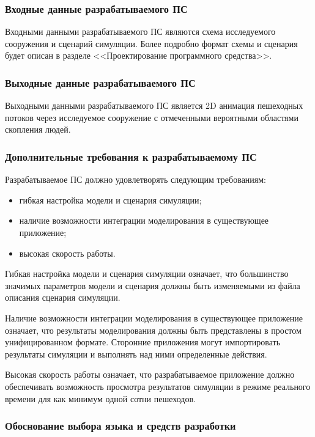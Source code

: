 \subsubsection{Входные данные разрабатываемого ПС}
\label{sub:domain:requirements:input}

Входными данными разрабатываемого ПС являются схема исследуемого сооружения и сценарий симуляции.
Более подробно формат схемы и сценария будет описан в разделе <<Проектирование программного средства>>.

\subsubsection{Выходные данные разрабатываемого ПС}
\label{sub:domain:requirements:output}

Выходными данными разрабатываемого ПС является 2D анимация пешеходных потоков через исследуемое сооружение с отмеченными вероятными областями скопления людей.

\subsubsection{Дополнительные требования к разрабатываемому ПС}
\label{sub:domain:requirements:additional}

Разрабатываемое ПС должно удовлетворять следующим требованиям:
\begin{itemize}
  \item гибкая настройка модели и сценария симуляции;
  \item наличие возможности интеграции моделирования в существующее приложение;
  \item высокая скорость работы.
\end{itemize}

Гибкая настройка модели и сценария симуляции означает, что большинство значимых параметров модели и сценария должны быть изменяемыми из файла описания сценария симуляции.

Наличие возможности интеграции моделирования в существующее приложение означает, что результаты моделирования должны быть представлены в простом унифицированном формате.
Сторонние приложения могут импортировать результаты симуляции и выполнять над ними определенные действия.

Высокая скорость работы означает, что разрабатываемое приложение должно обеспечивать возможность просмотра результатов симуляции в режиме реального времени для как минимум одной сотни пешеходов.

\subsubsection{Обоснование выбора языка и средств разработки}
\label{sub:domain:requirements:langs}

